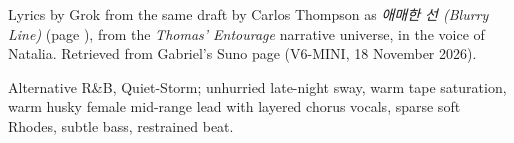 
\label{sec:recalibrate-the-space}
\begin{notes}
Lyrics by Grok from the same draft by Carlos Thompson as \emph{\textkorean{애매한 선} (Blurry Line)} (page \pageref{sec:blurry-line}), from the \emph{Thomas' Entourage} narrative universe, in the voice of Natalia. Retrieved from Gabriel's Suno page (V6-MINI, 18 November 2026).
\end{notes}
\begin{style}
Alternative R\&B, Quiet-Storm; unhurried late-night sway, warm tape saturation, warm husky female mid-range lead with layered chorus vocals, sparse soft Rhodes, subtle bass, restrained beat.
\end{style}
